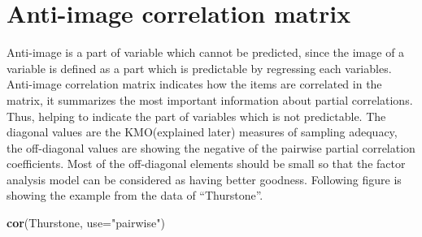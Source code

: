 \documentclass[]{book}
\newenvironment{Shaded}{\begin{snugshade}}{\end{snugshade}}
\newcommand{\DataTypeTok}[1]{\textcolor[rgb]{0.13,0.29,0.53}{#1}}
\newcommand{\KeywordTok}[1]{\textcolor[rgb]{0.13,0.29,0.53}{\textbf{#1}}}
\newcommand{\NormalTok}[1]{#1}
\newcommand{\StringTok}[1]{\textcolor[rgb]{0.31,0.60,0.02}{#1}}
\begin{document}
\hypertarget{anti-image-correlation-matrix}{%
\section{Anti-image correlation matrix}\label{anti-image-correlation-matrix}}

Anti-image is a part of variable which cannot be predicted, since the image of a variable is defined as a part which is predictable by regressing each variables. Anti-image correlation matrix indicates how the items are correlated in the matrix, it summarizes the most important information about partial correlations. Thus, helping to indicate the part of variables which is not predictable. The diagonal values are the KMO(explained later) measures of sampling adequacy, the off-diagonal values are showing the negative of the pairwise partial correlation coefficients. Most of the off-diagonal elements should be small so that the factor analysis model can be considered as having better goodness.
Following figure is showing the example from the data of ``Thurstone''.

\begin{Shaded}
\begin{Highlighting}[]
\KeywordTok{cor}\NormalTok{(Thurstone, }\DataTypeTok{use=}\StringTok{"pairwise"}\NormalTok{)}
\end{Highlighting}
\end{Shaded}
\end{document}

